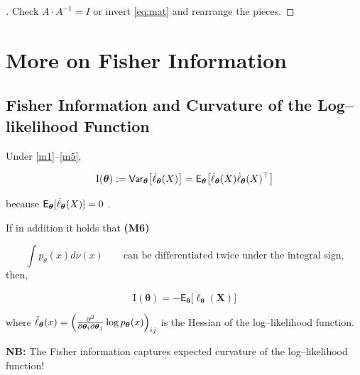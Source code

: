 \begin{proof}[]
Check \(A \cdot A^{-1} = I\) or invert \eqref{eq:mat}  and rearrange
the pieces.
\end{proof}

\section{More on Fisher Information}%
\label{sec:mfi}

\subsection{Fisher Information and Curvature of the Log--likelihood Function}%
\label{sub:ficlogf}
Under \ref{m1}--\ref{m5},

\[\mathrm{I}(\boldsymbol{\theta}) := \mathsf{Var}_{\boldsymbol{\theta}} \big[ \dot{\ell}_{\boldsymbol{\theta}}(X) \big] = \mathsf{E}_{\boldsymbol{\theta}} \big[ \dot{\ell}_{\boldsymbol{\theta}}(X) \dot{\ell}_{\boldsymbol{\theta}}(X)^{\top} \big]\]

because \(\mathsf{E}_{\boldsymbol{\theta}}[\dot{\ell}_{\boldsymbol{\theta}}(X)] = 0\) .

If in addition it holds that \textbf{(M6)} 

\[
	\int p_{\theta}(x) d\nu(x)\quad \quad  \text{can be differentiated twice under the
integral sign,}
\]
then,

\[\mathrm{I}(\boldsymbol{\theta}) = -\mathsf{E}_{\boldsymbol{\theta}} \big[ \ddot{\boldsymbol{\ell}}_{\boldsymbol{\theta}}(\boldsymbol{X}) \big]\]

where
\(\ddot{\ell}_{\boldsymbol{\theta}}(x) = \left(\frac{\partial^2}{\partial \boldsymbol{\theta}_i \partial \boldsymbol{\theta}_j} \log p_{\boldsymbol{\theta}}(x)\right)_{ij}\)
is the Hessian of the log--likelihood function.

\textbf{NB:}  The Fisher information captures expected curvature of the
log--likelihood function!

